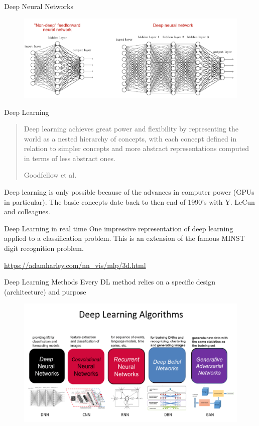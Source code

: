 \documentclass[11pt, aspectratio=43]{beamer}
\begin{document}
\begin{frame}{Deep Neural Networks}
			\begin{figure}[h]
	\centering
	\includegraphics[scale=0.4]{Figures/fig_deep_nn.png}
\end{figure}		
\end{frame}

\begin{frame}{Deep Learning}
	
	\begin{quote}
		Deep learning achieves great power and flexibility by representing the world as a nested hierarchy of concepts, with each concept defined in relation to simpler concepts and more abstract representations computed in terms of less abstract ones.
		
		Goodfellow et al. 
	\end{quote}
	


Deep  learning is only possible because of the advances in computer power (GPUs in particular). The basic concepts date back to then end of 1990's with Y. LeCun and colleagues. 
\end{frame}

\begin{frame}{Deep Learning in real time}
	One impressive representation of deep learning applied to a classification problem. This is an extension of the famous MINST digit recognition problem. 
	
	\url{https://adamharley.com/nn_vis/mlp/3d.html}
	
\end{frame}

\begin{frame}{Deep Learning Methods}
Every DL method relies on a specific design (architecture) and purpose
	\begin{figure}[h]
		\centering
		\includegraphics{Figures/DLalgorithms.png}
	\end{figure}	
\end{frame}
\end{document}
